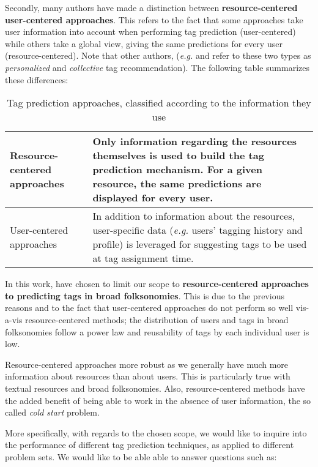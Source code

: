 Secondly, many authors \citep{illig_etal_2011,song_etal_2011} have made a distinction between \textbf{resource-centered user-centered approaches}. This refers to the fact that some approaches take user information into account when performing tag prediction (user-centered) while others take a global view, giving the same predictions for every user (resource-centered). Note that other authors, (\textit{e.g.} \cite{zhang_etal_2014} and \cite{hu_etal_2010} refer to these two types as \textit{personalized} and \textit{collective} tag recommendation). The following table summarizes these differences:

\begin{table}[!h]
\centering
\caption{Tag prediction approaches, classified according to the information they use}
\begin{tabular}{|p{3.5cm}|p{10cm}|}
\hline
Resource-centered approaches & Only information regarding the resources themselves is used to build the tag prediction mechanism. For a given resource, the same predictions are displayed for every user. \\
\hline
User-centered approaches & In addition to information about the resources, user-specific data (\textit{e.g.} users' tagging history and profile) is leveraged for suggesting tags to be used at tag assignment time.\\
\hline
\end{tabular}
\label{tab:resource_vs_user_centered}
\end{table}

In this work, have chosen to limit our scope to \textbf{resource-centered approaches to predicting tags in broad folksonomies}. This is due to the previous reasons and to the fact \citep{song_etal_2011} that user-centered approaches do not perform so well vis-a-vis resource-centered methods; the distribution of users and tags in broad folksonomies follow a power law and reusability of tags by each individual user is low. 

Resource-centered approaches more robust as we generally have much more information about resources than about users. This is particularly true with textual resources and broad folksonomies. Also, resource-centered methods have the added benefit of being able to work in the absence of user information, the so called \textit{cold start} problem.

More specifically, with regards to the chosen scope, we would like to inquire into the performance of different tag prediction techniques, as applied to different problem sets. We would like to be able able to answer questions such as:

